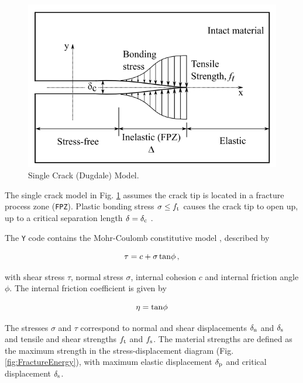 \documentclass[format=acmtog,12pt,screen=true,review=false,natbib=false,]{acmart}
\begin{document}
\begin{figure}[!htbp]
    \centering
    \includegraphics[width=\columnwidth]{LaminatedGlassProjectile/finalreport/Dugdale.PNG}
    \caption{Single Crack (Dugdale) Model. \cite{Abu15}}
    \label{fig:dugdale}
\end{figure}

\bigbreak
The single crack model in Fig. \ref{fig:dugdale} assumes the crack tip is located in a fracture process zone (\texttt{FPZ}). Plastic bonding stress $\sigma\leq f_{\rm{t}}$ causes the crack tip to open up, up to a critical separation length $\delta=\delta_{\rm{c}}$ \cite{Abu15}. 

\bigbreak
The \texttt{Y} code contains the Mohr-Coulomb constitutive model \cite{Lat15}, described by

\begin{equation}
    \label{eq:MohrCoulomb}
    \tau=c+\sigma\,{\rm{tan}}\phi\,,
\end{equation}

with shear stress $\tau$, normal stress $\sigma$, internal cohesion $c$ and internal friction angle $\phi$. The internal friction coefficient is given by

\begin{equation}
    \label{eq:intfriccoeff}
    \eta={\rm{tan}}\phi
\end{equation}

The stresses $\sigma$ and $\tau$ correspond to normal and shear displacements $\delta_{\rm{n}}$ and $\delta_{\rm{s}}$ and tensile and shear strengths $f_{\rm{t}}$ and $f_{\rm{s}}$. The material strengths are defined as the maximum strength in the stress-displacement diagram (Fig. \ref{fig:FractureEnergy}), with maximum elastic displacement $\delta_{\rm{p}}$ and critical displacement $\delta_{\rm{s}}$.
\end{document}
